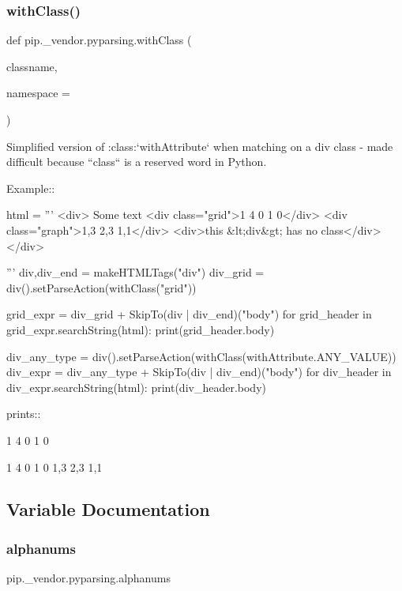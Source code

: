 \subsubsection{\texorpdfstring{with\+Class()}{withClass()}}
{\footnotesize\ttfamily def pip.\+\_\+vendor.\+pyparsing.\+with\+Class (\begin{DoxyParamCaption}\item[{}]{classname,  }\item[{}]{namespace = {\ttfamily \textquotesingle{}\textquotesingle{}} }\end{DoxyParamCaption})}

\begin{DoxyVerb}Simplified version of :class:`withAttribute` when
matching on a div class - made difficult because ``class`` is
a reserved word in Python.

Example::

    html = '''
        <div>
        Some text
        <div class="grid">1 4 0 1 0</div>
        <div class="graph">1,3 2,3 1,1</div>
        <div>this &lt;div&gt; has no class</div>
        </div>

    '''
    div,div_end = makeHTMLTags("div")
    div_grid = div().setParseAction(withClass("grid"))

    grid_expr = div_grid + SkipTo(div | div_end)("body")
    for grid_header in grid_expr.searchString(html):
        print(grid_header.body)

    div_any_type = div().setParseAction(withClass(withAttribute.ANY_VALUE))
    div_expr = div_any_type + SkipTo(div | div_end)("body")
    for div_header in div_expr.searchString(html):
        print(div_header.body)

prints::

    1 4 0 1 0

    1 4 0 1 0
    1,3 2,3 1,1
\end{DoxyVerb}
 

\subsection{Variable Documentation}
\mbox{\label{namespacepip_1_1__vendor_1_1pyparsing_ac296a4533e5734167a2dbbae1769d6e3}} 
\subsubsection{\texorpdfstring{alphanums}{alphanums}}
{\footnotesize\ttfamily pip.\+\_\+vendor.\+pyparsing.\+alphanums}


